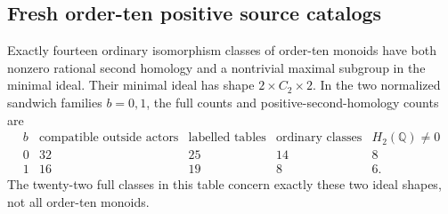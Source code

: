 \subsection{Fresh order-ten positive source catalogs}

\begin{proposition}
\label{CP2:A-C2-Rees-order10-sources}
Exactly fourteen ordinary isomorphism classes of order-ten
monoids have both nonzero rational second homology and a
nontrivial maximal subgroup in the minimal ideal. Their
minimal ideal has shape $2\times C_2\times2$. In the two
normalized sandwich families $b=0,1$, the full counts and
positive-second-homology counts are
\[
\begin{array}{c|r|r|r|r}
b&\text{compatible outside actors}&
\text{labelled tables}&\text{ordinary classes}&H_2(\mathbb Q)\ne0\\\hline
0&32&25&14&8\\
1&16&19&8&6.
\end{array}
\]
The twenty-two full classes in this table concern exactly
these two ideal shapes, not all order-ten monoids.
\end{proposition}
